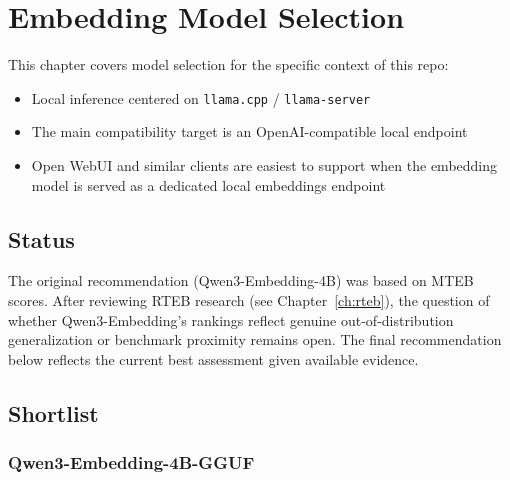 \chapter{Embedding Model Selection}
\label{ch:model-selection}

This chapter covers model selection for the specific context of this repo:

\begin{itemize}
    \item Local inference centered on \texttt{llama.cpp} / \texttt{llama-server}
    \item The main compatibility target is an OpenAI-compatible local endpoint
    \item Open WebUI and similar clients are easiest to support when the embedding model
          is served as a dedicated local embeddings endpoint
\end{itemize}

\section{Status}

\begin{warningbox}
The original recommendation (Qwen3-Embedding-4B) was based on MTEB scores. After reviewing
RTEB research (see Chapter~\ref{ch:rteb}), the question of whether Qwen3-Embedding's rankings
reflect genuine out-of-distribution generalization or benchmark proximity remains open. The
final recommendation below reflects the current best assessment given available evidence.
\end{warningbox}

\section{Shortlist}

\subsection{Qwen3-Embedding-4B-GGUF}

